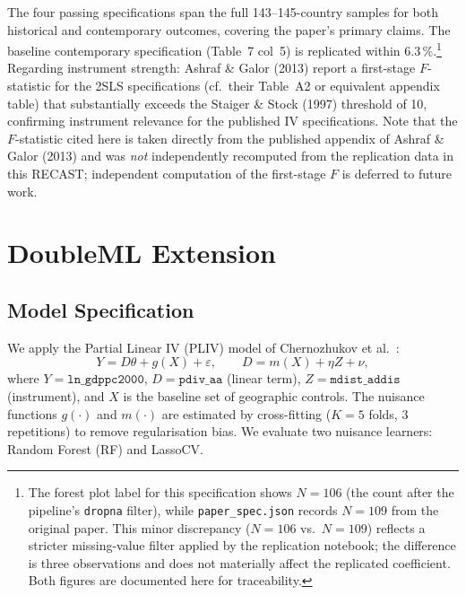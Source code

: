 \documentclass[12pt,letterpaper]{article}
\begin{document}
The four passing specifications span the full 143--145-country samples for both
historical and contemporary outcomes, covering the paper's primary claims.
The baseline contemporary specification (Table~7 col~5) is replicated
within 6.3\,\%.\footnote{The forest plot label for this specification shows
$N = 106$ (the count after the pipeline's \texttt{dropna} filter), while
\texttt{paper\_spec.json} records $N = 109$ from the original paper. This
minor discrepancy ($N=106$ vs.\ $N=109$) reflects a stricter missing-value
filter applied by the replication notebook; the difference is three
observations and does not materially affect the replicated coefficient.
Both figures are documented here for traceability.}
Regarding instrument strength: Ashraf \& Galor (2013) report a first-stage
$F$-statistic for the 2SLS specifications (cf.\ their Table~A2 or equivalent
appendix table) that substantially exceeds the Staiger \& Stock (1997)
threshold of 10, confirming instrument relevance for the published IV
specifications.
Note that the $F$-statistic cited here is taken directly from the published
appendix of Ashraf \& Galor (2013) and was \emph{not} independently recomputed
from the replication data in this RECAST; independent computation of the
first-stage $F$ is deferred to future work.



\section{DoubleML Extension}

\subsection{Model Specification}

We apply the Partial Linear IV (PLIV) model of Chernozhukov et al.\ \cite{chernozhukov2018}:
\begin{equation}
  Y = D\theta + g(X) + \varepsilon, \qquad
  D = m(X) + \eta Z + \nu,
\end{equation}
where $Y = \texttt{ln\_gdppc2000}$, $D = \texttt{pdiv\_aa}$ (linear term),
$Z = \texttt{mdist\_addis}$ (instrument), and $X$ is the baseline set of
geographic controls.
The nuisance functions $g(\cdot)$ and $m(\cdot)$ are estimated by
cross-fitting ($K=5$ folds, 3 repetitions) to remove regularisation bias.
We evaluate two nuisance learners: Random Forest (RF) and LassoCV.
\end{document}
